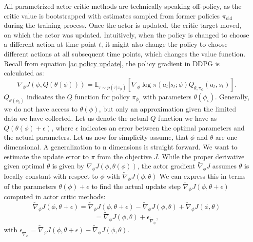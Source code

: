 All parametrized actor critic methods are technically speaking off-policy, as the critic value is bootstrapped with estimates sampled from former policies $\pi_{\mathrm{old}}$ during the training process. 
Once the actor is updated, the 
critic target moved, on which the actor was updated. Intuitively, when the policy is changed to choose a different action at time point $t$, it might also change 
the policy to choose different actions at 
all subsequent time points, which changes the value function. \\

Recall from equation \ref{ac policy update}, the policy gradient in DDPG is calculated as:
\begin{equation}
    \nabla_{\phi} J(\phi, Q(\theta(\phi))) = \mathbb{E}_{\tau \sim p(\tau | \pi_{\phi})} \left[\nabla_{\phi} \log \pi(a_t|s_t;\phi) Q_{\theta, \pi_\phi}(a_t, s_t) \right].
\end{equation}
$Q_{\theta(\phi_i)}$ indicates the $Q$ function for policy $\pi_{\phi_{i}}$ with parameters 
$\theta(\phi_i)$. 
Generally, we do not have access to $\theta(\phi)$, but only an approximation given the limited data we have collected. Let us denote the actual 
$Q$ function we have as $Q(\theta(\phi) + \epsilon)$, where $\epsilon$ indicates an error between the optimal parameters and the actual parameters.
Let us now for simplicity assume, that $\phi$ and $\theta$ are one dimensional. A generalization to n dimensions is straight forward. We want 
to estimate the update error to $\pi$ from the objective $J$. While the proper derivative given optimal $\theta$ is given by $\nabla_{\phi} J(\phi, \theta(\phi))$,
the actor gradient $\widetilde{\nabla}_\phi J$ assumes $\theta$ is locally constant with respect to $\phi$ with $\widetilde{\nabla}_\phi J(\phi, \theta)$ 
We can express this in terms of the parameters $\theta(\phi) + \epsilon$ to 
find the actual update step $\widetilde{\nabla}_{\phi} J(\phi, \theta + \epsilon)$ computed in actor critic methods:
\begin{equation*}
    \widetilde{\nabla}_{\phi} J(\phi, \theta + \epsilon) = \widetilde{\nabla}_{\phi} J(\phi, \theta + \epsilon) - \widetilde{\nabla}_{\phi} J(\phi, \theta) + \widetilde{\nabla}_{\phi} J(\phi, \theta)
\end{equation*}
\begin{equation*}
    = \widetilde{\nabla}_{\phi} J(\phi, \theta) + \epsilon_{\widetilde{\nabla}_{\phi}},
\end{equation*}
with $\epsilon_{\widetilde{\nabla}_{\phi}} = \widetilde{\nabla}_{\phi} J(\phi, \theta + \epsilon) - \widetilde{\nabla}_{\phi} J(\phi, \theta)$.
